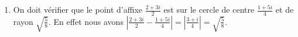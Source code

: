 \documentclass[a4paper,12pt,reqno]{amsart}
\begin{document}
\begin{solution}
\begin{enumerate}
    \item On doit vérifier que le point d'affixe $\frac{2+3i}{2}$ est sur le cercle de centre $\frac{1+5i}{4}$ et de rayon $\sqrt{\frac{5}{8}}$. En effet nous avons $|\frac{2+3i}{2}-\frac{1+5i}{4}|=|\frac{3+i}{4}|=\sqrt{\frac{5}{8}}$.
  \end{enumerate}

\end{solution}
\end{document}
